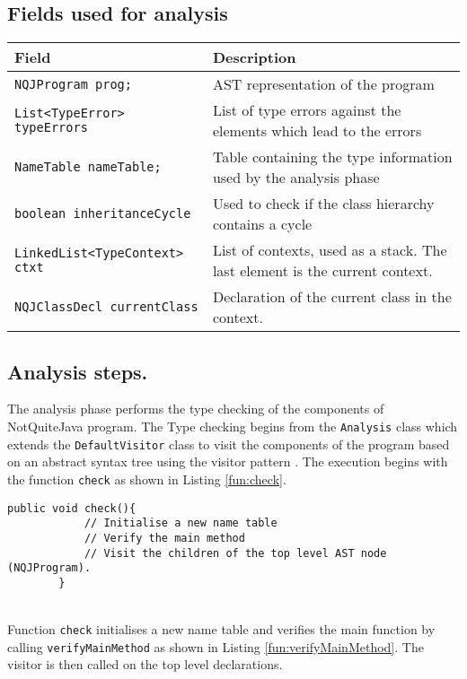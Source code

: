 \documentclass[]{tukportfolio}
\begin{document}
\subsection{Fields used for analysis}
\begin{center}
	\begin{tabular}{| m{}|m{}|}
		\hline
		\textbf{Field} & \textbf{Description} \\
		\hline
\lstinline|NQJProgram prog;| &	AST representation of the program\\
\hline
\lstinline|List<TypeError> typeErrors| &	List of type errors against the elements which lead to the errors\\
\hline
\lstinline|NameTable nameTable;|&	Table containing the type information used by the analysis phase\\
\hline
\lstinline|boolean inheritanceCycle| &	\label{field:inheritanceCycle} Used to check if the class hierarchy contains a cycle\\
\hline
\lstinline|LinkedList<TypeContext> ctxt|&	List of contexts, used as a stack. The last element is the current context.\\
\hline
\label{field:currentClass}
\lstinline|NQJClassDecl currentClass|&	Declaration of the current class in the context.\\
\hline
	\end{tabular}
\end{center}


\subsection{Analysis steps.}

The analysis phase performs the type checking of the components of NotQuiteJava program. The Type checking begins from the \lstinline|Analysis| class which extends the \lstinline|DefaultVisitor| class to visit the components of the program based on an abstract syntax tree using the visitor pattern \cite{szczukocki_2019}. The execution begins with the function \lstinline|check|  as shown in Listing \ref{fun:check}. 

\begin{lstlisting}[caption={\lstinline|check| method in \lstinline|Analysis|},captionpos=b,label={fun:check}]
		public void check(){
			// Initialise a new name table
			// Verify the main method
			// Visit the children of the top level AST node (NQJProgram).
		}
\end{lstlisting}~\\
Function \lstinline|check| initialises a new name table and verifies the main function by calling \lstinline|verifyMainMethod| as shown in Listing \ref{fun:verifyMainMethod}. The visitor is then called on the top level declarations.
\end{document}
